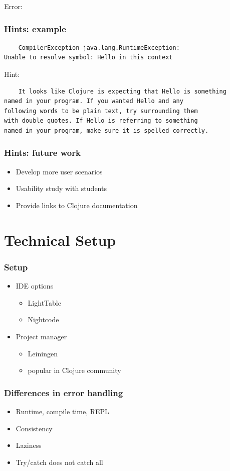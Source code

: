 \documentclass{beamer}
\begin{document}
\begin{frame}[fragile]
Error:
\frametitle{Hints: example}
  	 \begin{verbatim}
	CompilerException java.lang.RuntimeException:
Unable to resolve symbol: Hello in this context
	\end{verbatim}
Hint:
	\begin{verbatim}
	It looks like Clojure is expecting that Hello is something
named in your program. If you wanted Hello and any
following words to be plain text, try surrounding them
with double quotes. If Hello is referring to something
named in your program, make sure it is spelled correctly.
	\end{verbatim}
\end{frame}

\begin{frame}
\frametitle{Hints: future work}
	\begin{itemize}
  	 \item Develop more user scenarios
  	 \item Usability study with students
  	 \item Provide links to Clojure documentation
	 \end{itemize}
\end{frame}

\section{Technical Setup}

\begin{frame}
\frametitle{Setup}
	\begin{itemize}
		\item IDE options
		\begin{itemize}
			\item LightTable
			\item Nightcode
		\end{itemize}
		\item Project manager
		\begin{itemize}
			\item Leiningen
			\item popular in Clojure community
		\end{itemize}
	\end{itemize}
\end{frame}

\begin{frame}
	\frametitle {Differences in error handling}
	\begin{itemize}
		\item Runtime, compile time, REPL
		\item Consistency
		\item Laziness
		\item Try/catch does not catch all
	\end{itemize}
\end{frame}
\end{document}
